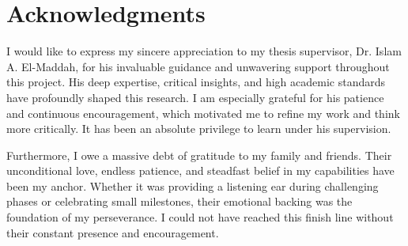 \chapter*{Acknowledgments}
\label{chap:ack}
\pagestyle{plain}

I would like to express my sincere appreciation to my thesis supervisor, Dr. Islam A. El-Maddah, for his invaluable guidance and unwavering support throughout this project. His deep expertise, critical insights, and high academic standards have profoundly shaped this research. I am especially grateful for his patience and continuous encouragement, which motivated me to refine my work and think more critically. It has been an absolute privilege to learn under his supervision.

Furthermore, I owe a massive debt of gratitude to my family and friends. Their unconditional love, endless patience, and steadfast belief in my capabilities have been my anchor. Whether it was providing a listening ear during challenging phases or celebrating small milestones, their emotional backing was the foundation of my perseverance. I could not have reached this finish line without their constant presence and encouragement.
